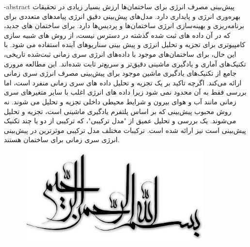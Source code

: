 \department{}

\fa-abstract{
    پیش‌بینی مصرف انرژی برای ساختمان‌ها ارزش بسیار زیادی در تحقیقات بهره‌وری انرژی و پایداری دارد. مدل‌های پیش‌بینی دقیق انرژی پیامدهای متعددی برای برنامه‌ریزی و بهینه‌سازی انرژی ساختمان‌ها و پردیس‌ها دارد. برای ساختمان های جدید، 
    که در آن داده های ثبت شده گذشته در دسترس نیست، از روش های شبیه سازی کامپیوتری برای تجزیه و تحلیل انرژی و پیش بینی سناریوهای آینده استفاده می شود. 
    با این حال، برای ساختمان‌های موجود با داده‌های انرژی سری زمانی ثبت‌شده تاریخی، تکنیک‌های آماری و یادگیری ماشینی دقیق‌تر و سریع‌تر ثابت شده‌اند. این مطالعه مروری جامع از تکنیک‌های یادگیری ماشین موجود برای پیش‌بینی مصرف انرژی سری زمانی ارائه می‌کند.
     اگرچه تاکید بر یک تجزیه و تحلیل داده های سری زمانی منفرد است، اما بررسی فقط به آن محدود نمی شود زیرا داده های انرژی اغلب با سایر متغیرهای سری زمانی مانند آب و هوای بیرون و شرایط محیطی داخلی تجزیه و تحلیل می شوند. 
     نه روش محبوب پیش‌بینی که بر اساس پلتفرم یادگیری ماشینی است، تجزیه و تحلیل می‌شوند. یک بررسی و تحلیل عمیق از "مدل ترکیبی"، که ترکیبی از دو یا چند تکنیک پیش‌بینی است نیز ارائه شده است. ترکیبات مختلف مدل ترکیبی موثرترین در پیش‌بینی انرژی سری زمانی برای ساختمان هستند.
}




\AUTtitle
\vspace*{7cm}
\thispagestyle{empty}
\begin{center}
\includegraphics[height=5cm,width=12cm]{besm}
\end{center}